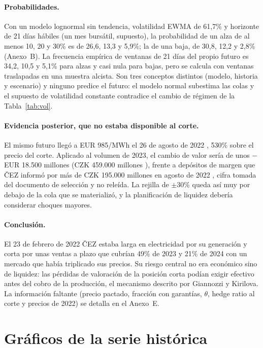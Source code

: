 \documentclass[11pt,letterpaper]{article}
\theoremstyle{plain}
\theoremstyle{definition}
\theoremstyle{remark}
\numberwithin{equation}{section}
\begin{document}
\paragraph{Probabilidades.} Con un modelo lognormal sin tendencia, volatilidad EWMA de 
61,7\% y horizonte de 21 días hábiles (un mes bursátil, supuesto), la probabilidad de un 
alza de al menos 10, 20 y 30\% es de 26,6, 13,3 y 5,9\%; la de una baja, de 30,8, 12,2 y 
2,8\% (Anexo~B). La frecuencia empírica de ventanas de 21 días del propio futuro es 34,2, 
10,5 y 5,1\% para alzas y casi nula para bajas, pero se calcula con ventanas traslapadas 
en una muestra alcista. Son tres conceptos distintos (modelo, historia y escenario) y 
ninguno predice el futuro: el modelo normal subestima las colas y el supuesto de volatilidad 
constante contradice el cambio de régimen de la Tabla~\ref{tab:vol}.

\paragraph{Evidencia posterior, que no estaba disponible al corte.} El mismo futuro llegó a 
EUR 985/MWh el 26 de agosto de 2022 \parencite{eex_2022}, 530\% sobre el precio del corte. 
Aplicado al volumen de 2023, el cambio de valor sería de unos $-$EUR 18.500 millones 
(CZK 459.000 millones ), frente a depósitos de margen que ČEZ informó por más de CZK 195.000 
millones en agosto de 2022 \parencite{cez_pr_2023}, cifra tomada del documento de selección 
y no releída. La rejilla de $\pm30\%$ queda así muy por debajo de la cola que se materializó, 
y la planificación de liquidez debería considerar choques mayores.

\paragraph{Conclusión.} El 23 de febrero de 2022 ČEZ estaba larga en electricidad por su 
generación y corta por unas ventas a plazo que cubrían 49\% de 2023 y 21\% de 2024 con un 
mercado que había triplicado sus precios. Su riesgo central no era económico sino de 
liquidez: las pérdidas de valoración de la posición corta podían exigir efectivo antes del 
cobro de la producción, el mecanismo descrito por Giannozzi y Kirilova. La información 
faltante (precio pactado, fracción con garantías, $\theta$, hedge ratio al corte y precios 
de 2022) se detalla en el Anexo~E.

\section{Gráficos de la serie histórica}
\end{document}
